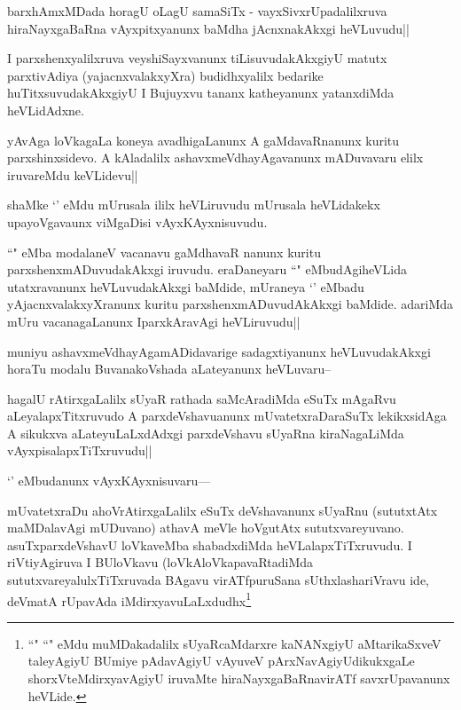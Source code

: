 \begin{artha}
barxhAmxMDada horagU oLagU samaSiTx - vayxSivxrUpadalilxruva hiraNayxgaBaRna vAyxpitxyanunx baMdha jAcnxnakAkxgi heVLuvudu||
\end{artha}


\begin{artha}
I parxshenxyalilxruva veyshiSayxvanunx tiLisuvudakAkxgiyU matutx parxtivAdiya (yajacnxvalakxyXra) budidhxyalilx bedarike huTitxsuvudakAkxgiyU I Bujuyxvu tananx katheyanunx yatanxdiMda heVLidAdxne.
\end{artha}

\begin{artha}
yAvAga loVkagaLa koneya avadhigaLanunx A gaMdavaRnanunx kuritu parxshinxsidevo. A kAladalilx ashavxmeVdhayAgavanunx mADuvavaru elilx iruvareMdu keVLidevu||
\end{artha}

\begin{artha}
shaMke `\stext' eMdu mUrusala ililx heVLiruvudu mUrusala heVLidakekx upayoVgavaunx viMgaDisi vAyxKAyxnisuvudu.
\end{artha}

\begin{artha}
``\stext" eMba modalaneV vacanavu gaMdhavaR nanunx kuritu parxshenxmADuvudakAkxgi iruvudu. eraDaneyaru ``\stext" eMbudAgiheVLida utatxravanunx heVLuvudakAkxgi baMdide, mUraneya `\stext' eMbadu yAjacnxvalakxyXranunx kuritu parxshenxmADuvudAkAkxgi baMdide. adariMda mUru vacanagaLanunx IparxkAravAgi heVLiruvudu||
\end{artha}

\begin{artha}
muniyu ashavxmeVdhayAgamADidavarige sadagxtiyanunx heVLuvudakAkxgi horaTu modalu BuvanakoVshada aLateyanunx heVLuvaru--
\end{artha}

\begin{artha}
hagalU rAtirxgaLalilx sUyaR rathada saMcAradiMda eSuTx mAgaRvu aLeyalapxTitxruvudo A parxdeVshavuanunx mUvatetxraDaraSuTx lekikxsidAga A sikukxva aLateyuLaLxdAdxgi parxdeVshavu sUyaRna kiraNagaLiMda vAyxpisalapxTiTxruvudu||
\end{artha}

\begin{artha}
`\stext' eMbudanunx vAyxKAyxnisuvaru---
\end{artha}

\begin{artha}
mUvatetxraDu ahoVrAtirxgaLalilx eSuTx deVshavanunx sUyaRnu (sututxtAtx maMDalavAgi mUDuvano) athavA meVle hoVgutAtx sututxvareyuvano. asuTxparxdeVshavU loVkaveMba shabadxdiMda heVLalapxTiTxruvudu. I riVtiyAgiruva I BUloVkavu (loVkAloVkapavaRtadiMda sututxvareyalulxTiTxruvada BAgavu virATfpuruSana sUthxlashariVravu ide, deVmatA rUpavAda iMdirxyavuLaLxdudhx\footnote{``\stext" ``\stext" eMdu muMDakadalilx sUyaRcaMdarxre kaNANxgiyU aMtarikaSxveV taleyAgiyU BUmiye pAdavAgiyU vAyuveV pArxNavAgiyUdikukxgaLe shorxVteMdirxyavAgiyU iruvaMte hiraNayxgaBaRnavirATf savxrUpavanunx heVLide.}
\end{artha}

